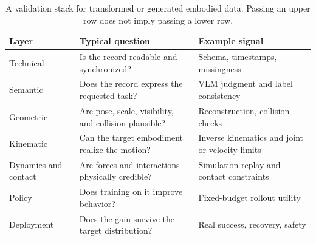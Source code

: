 \begin{table}[t]
\centering
\caption{A validation stack for transformed or generated embodied data. Passing an upper row does not imply passing a lower row.}
\label{tab:validation-stack}
\small
\setlength{\tabcolsep}{4pt}
\begin{tabularx}{\columnwidth}{@{}p{1.8cm}X p{1.8cm}@{}}
\toprule
Layer & Typical question & Example signal \\
\midrule
Technical & Is the record readable and synchronized? & Schema, timestamps, missingness \\
Semantic & Does the record express the requested task? & VLM judgment and label consistency \\
Geometric & Are pose, scale, visibility, and collision plausible? & Reconstruction, collision checks \\
Kinematic & Can the target embodiment realize the motion? & Inverse kinematics and joint or velocity limits \\
Dynamics and contact & Are forces and interactions physically credible? & Simulation replay and contact constraints \\
Policy & Does training on it improve behavior? & Fixed-budget rollout utility \\
Deployment & Does the gain survive the target distribution? & Real success, recovery, safety \\
\bottomrule
\end{tabularx}
\end{table}
